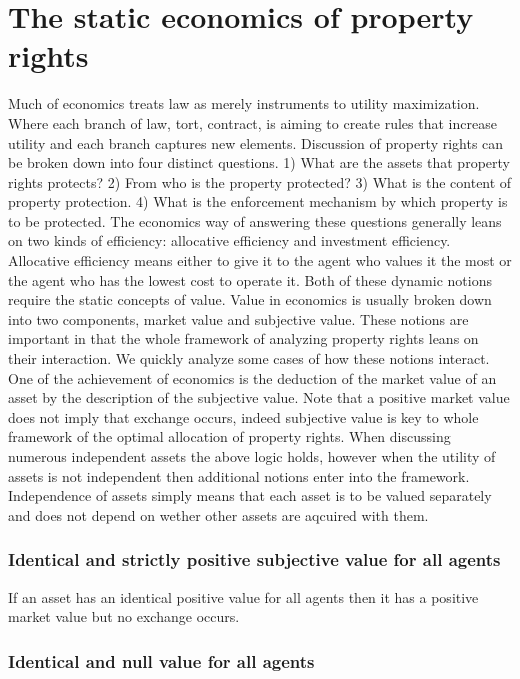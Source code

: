 \documentclass[12pt]{article}
\numberwithin{equation}{section}
\begin{document}
\newpage
\section{The static economics of property rights}

Much of economics treats law as merely instruments to utility maximization. Where each branch of law, tort, contract, is aiming to create rules that increase utility and each branch captures new elements. Discussion of property rights can be broken down into four distinct questions. 1) What are the assets that property rights protects? 2) From who is the property protected? 3) What is the content of property protection. 4) What is the enforcement mechanism by which property is to be protected. The economics way of answering these questions generally leans on two kinds of efficiency: allocative efficiency and investment efficiency. Allocative efficiency means either to give it to the agent who values it the most or the agent who has the lowest cost to operate it. Both of these dynamic notions require the static concepts of value. Value in economics is usually broken down into two components, market value and subjective value. These notions are important in that the whole framework of analyzing property rights leans on their interaction. We quickly analyze some cases of how these notions interact. One of the achievement of economics is the deduction of the market value of an asset by the description of the subjective value. Note that a positive market value does not imply that exchange occurs, indeed subjective value is key to whole framework of the optimal allocation of property rights. When discussing numerous independent assets the above logic holds, however when the utility of assets is not independent then additional notions enter into the framework. Independence of assets simply means that each asset is to be valued separately and does not depend on wether other assets are aqcuired with them. 


\subsubsection{Identical and strictly positive subjective value for all agents}

If an asset has an identical positive value for all agents then it has a positive market value but no exchange occurs. 

\subsubsection{Identical and null value for all agents}
\end{document}
